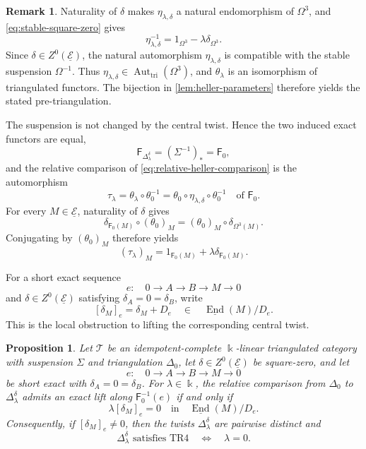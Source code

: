 \documentclass[a4paper,11pt,reqno]{amsart}
\newtheorem{proposition}[proposition]{Proposition}
\theoremstyle{definition}
\newtheorem{remark}[remark]{Remark}
\theoremstyle{plain}
\numberwithin{equation}{section}
\newcommand{\T}{\mathcal T}
\newcommand{\End}{\operatorname{End}}
\newcommand{\kk}{\Bbbk}
\begin{document}
\begin{remark}
Naturality of \(\delta\) makes
\(\eta_{\lambda,\delta}\) a natural endomorphism of \(\Omega^3\), and
\eqref{eq:stable-square-zero} gives
\[
 \eta_{\lambda,\delta}^{-1}
 =1_{\Omega^3}-\lambda\delta_{\Omega^3}.
\]
Since \(\delta\in Z^0(\underline{\mathcal E})\), the natural automorphism
\(\eta_{\lambda,\delta}\) is compatible with the stable suspension
\(\Omega^{-1}\).  Thus
\(\eta_{\lambda,\delta}\in\operatorname{Aut}_{\mathrm{tri}}(\Omega^3)\),
and \(\theta_\lambda\) is an isomorphism of triangulated functors.  The bijection
in \cref{lem:heller-parameters} therefore yields the stated
pre-triangulation.
\end{remark}

The suspension is not changed by the central twist.  Hence the two induced
exact functors are equal,
\[
 \mathsf F_{\Delta_\lambda^\delta}
 = (\Sigma^{-1})_*=\mathsf F_0,
\]
and the relative comparison of \eqref{eq:relative-heller-comparison} is
the automorphism
\[
 \tau_\lambda
 =\theta_\lambda\circ\theta_0^{-1}
 =\theta_0\circ\eta_{\lambda,\delta}\circ\theta_0^{-1}
 \quad\text{of }\mathsf F_0.
\]
For every \(M\in\underline{\mathcal E}\), naturality of \(\delta\) gives
\[
 \delta_{\mathsf F_0(M)}\circ(\theta_0)_M
 =(\theta_0)_M\circ\delta_{\Omega^3(M)}.
\]
Conjugating by \((\theta_0)_M\) therefore yields
\begin{equation}
\label{eq:central-relative-comparison}
 (\tau_\lambda)_M
 =1_{\mathsf F_0(M)}+\lambda\delta_{\mathsf F_0(M)}.
\end{equation}

For a short exact sequence
\[
 e:\quad0\longrightarrow A\longrightarrow B\longrightarrow M
 \longrightarrow0
\]
and \(\delta\in Z^0(\underline{\mathcal E})\) satisfying
\(\delta_A=0=\delta_B\), write
\begin{equation}
\label{eq:central-endpoint-class}
 [\delta_M]_e=\delta_M+D_e
 \quad\in\quad
 \underline{\End}(M)/D_e.
\end{equation}
This is the local obstruction to lifting the corresponding central twist.

\begin{proposition}
\label{prop:central-twist-obstruction}
Let \(\T\) be an idempotent-complete \(\kk\)-linear triangulated category
with suspension \(\Sigma\) and triangulation \(\Delta_0\), let
\(\delta\in Z^0(\underline{\mathcal E})\) be square-zero, and let
\[
 e:\quad0\longrightarrow A\longrightarrow B\longrightarrow M
 \longrightarrow0
\]
be short exact with \(\delta_A=0=\delta_B\).  For \(\lambda\in\kk\), the
relative comparison from \(\Delta_0\) to \(\Delta_\lambda^\delta\) admits
an exact lift along \(\mathsf F_0^{-1}(e)\) if and only if
\begin{equation}
\label{eq:central-endpoint-obstruction}
 \lambda[\delta_M]_e=0
 \quad\text{in}\quad
 \underline{\End}(M)/D_e.
\end{equation}
Consequently, if \([\delta_M]_e\ne0\), then the twists
\(\Delta_\lambda^\delta\) are pairwise distinct and
\[
 \Delta_\lambda^\delta\text{ satisfies }\mathrm{TR4}
 \quad\Longleftrightarrow\quad
 \lambda=0.
\]
\end{proposition}
\end{document}
